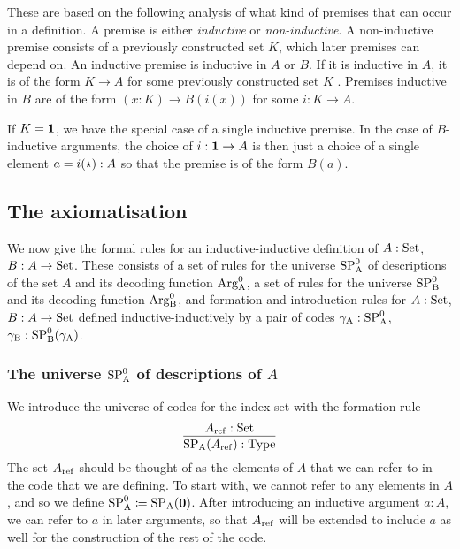 \documentclass{article}
\begin{document}
These are based on the following analysis of what kind of premises
that can occur in a definition. A premise is either \emph{inductive}
or \emph{non-inductive}. A non-inductive premise consists of a
previously constructed set $K$, which later premises can depend on. An
inductive premise is inductive in $A$ or $B$. If it is inductive in
$A$, it is of the form $K \to A$ for some previously constructed set
$K$%
. Premises inductive in $B$ are of the form $(x : K) \to
B(i(x))$ for some $i : K \to A$. 

If $K = \mathbf{1}$, we have the special case of a single inductive
premise. In the case of $B$-inductive arguments, the choice of $i :
\mathbf{1} \to A$ is then just a choice of a single element $a = i(\star)
: A$ so that the premise is of the form $B(a)$.




\subsection{The axiomatisation}
\label{sec:formal-axiomatisation}

We now give the formal rules for an inductive-inductive definition of
$A : \text{Set}$, $B : A \to \text{Set}$. These consists of a set of rules for the
universe $\text{SP}^{0}_{\mathrm{A}}$ of descriptions of the set $A$ and its decoding
function $\text{Arg}^{0}_{\mathrm{A}}$, a set of rules for the universe $\text{SP}^{0}_{\mathrm{B}}$ and its
decoding function $\text{Arg}^{0}_{\mathrm{B}}$, and formation and introduction rules for
$A: \text{Set}$, $B: A \to \text{Set}$ defined inductive-inductively by a pair of
codes $\gamma_{\mathrm{A}} : \text{SP}^{0}_{\mathrm{A}}$, $\gamma_{\mathrm{B}} : \text{SP}^{0}_{\mathrm{B}}(\gamma_{\mathrm{A}})$.

\subsubsection{The universe $\text{SP}^{0}_{\mathrm{A}}$ of descriptions of $A$}
\label{sec:SPA}
  
We introduce the universe of codes for the index set with the
formation rule
\[
\infer{\SPA(\Aref) : \TYPE}{\Aref : \Set}
\]
The set $A_{\mathrm{ref}}$ should be thought of as the elements of $A$ that we
can refer to in the code that we are defining. To start with, we
cannot refer to any elements in $A$, and so we define $\text{SP}^{0}_{\mathrm{A}} \coloneqq
\text{SP}_{\mathrm{A}}(\mathbf{0})$. After introducing an inductive argument $a : A$, we can
refer to $a$ in later arguments, so that $A_{\mathrm{ref}}$ will be extended to
include $a$ as well for the construction of the rest of the code.
\end{document}

